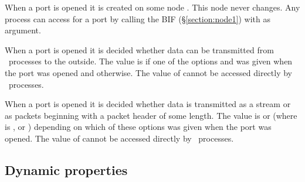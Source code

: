\begin{Lentry}
\item[\T{node[\Z{R}]}]
When a port is opened it is created on some node .
This node never changes. Any process can access 
for a port  by calling the BIF
 (\S\ref{section:node1})
with  as argument.

\item[\T{out[\Z{R}]}]
When a port is opened it is decided whether data can be transmitted from \Erlang\ processes
to the outside.  The value is  if one of the options  and  was
given when the port was opened and  otherwise.  The value of  cannot
be accessed directly by \Erlang\ processes.

\item[\T{packeting[\Z{R}]}]
When a port is opened it is decided whether data is transmitted as a stream or as packets
beginning with a packet header of some length.  The value is  or 
(where  is ,  or ) depending on which of these options was given when
the port was opened.  The value of  cannot be accessed directly by
\Erlang\ processes.
\end{Lentry}

\subsection{Dynamic properties}

\label{section:port-state-dynamic}

